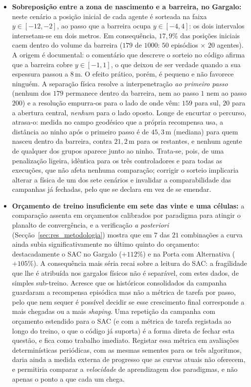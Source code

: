 \documentclass[12pt,reqno, twoside]{amsbook}
\theoremstyle{plain}
\numberwithin{equation}{chapter}
\numberwithin{section}{chapter}
\numberwithin{table}{chapter}
\numberwithin{figure}{chapter}
\begin{document}
\begin{itemize}
    \item \textbf{Sobreposição entre a zona de nascimento e a barreira, no Gargalo:} neste cenário a posição inicial de cada agente é sorteada na faixa $y \in [-12, -2]$, ao passo que a barreira ocupa $y \in [-4, 4]$: os dois intervalos intersetam-se em dois metros. Em consequência, \emph{$17{,}9\%$} das posições iniciais caem dentro do volume da barreira ($179$ de $1000$: $50$ episódios $\times$ $20$ agentes). A origem é documental: o comentário que descreve o sorteio no código afirma que a barreira cobre $y \in [-1, 1]$, o que deixou de ser verdade quando a sua espessura passou a $8$\,m. O efeito prático, porém, é pequeno e não favorece ninguém. A separação física resolve a interpenetração \emph{ao primeiro passo} (nenhum dos $179$ permanece dentro da barreira, nem ao passo $1$ nem ao passo $200$) e a resolução empurra-os para o lado de onde vêm: $159$ para sul, $20$ para a abertura central, \emph{nenhum} para o lado oposto. Longe de encurtar o percurso, atrasa-o: medida no campo geodésico que a própria recompensa usa, a distância ao ninho após o primeiro passo é de $45{,}3$\,m (mediana) para quem nasceu dentro da barreira, contra $21{,}2$\,m para os restantes, e nenhum agente de qualquer dos grupos aparece junto ao ninho. Trata-se, pois, de uma penalização ligeira, idêntica para os três controladores e para todas as execuções, que não afeta nenhuma comparação; corrigir o sorteio implicaria alterar a física de um dos sete cenários e invalidar a comparabilidade das campanhas já fechadas, pelo que se declara em vez de se emendar.
    \item \textbf{Orçamento de treino insuficiente em sete das vinte e uma células:} a comparação assenta em orçamentos calibrados por paradigma para atingir o planalto de convergência, e a verificação \textit{a posteriori} (Secção~\ref{sec:res_metodologia}) mostra que em $7$ das $21$ combinações a curva ainda subia significativamente no último quinto do orçamento: destacadamente o SAC no Gargalo ($+112\%$) e na Porta com Alternativa ($+105\%$). A consequência mais séria recai sobre a leitura do SAC: a fragilidade que lhe é atribuída nos gargalos físicos não é separável, com estes dados, de simples sub-treino. Acresce que os históricos consolidados da campanha guardaram a recompensa episódica mas não a métrica de tarefa por passo, pelo que nem sequer é possível decidir se esse crescimento final corresponde a mais chegadas ou a mais \textit{shaping}. Uma repetição da campanha com orçamento estendido para o SAC (e com a métrica de tarefa registada ao longo do treino, o que o código já suporta) é a forma direta de fechar esta questão, e fica como trabalho imediato. Registar essa métrica em avaliações determinísticas periódicas, com as mesmas sementes para os três algoritmos, daria ainda a medida externa de progresso que as curvas atuais não oferecem, e permitiria comparar a \emph{velocidade} de aprendizagem dos paradigmas, e não apenas o ponto a que cada um chega.

\end{itemize}
\end{document}
